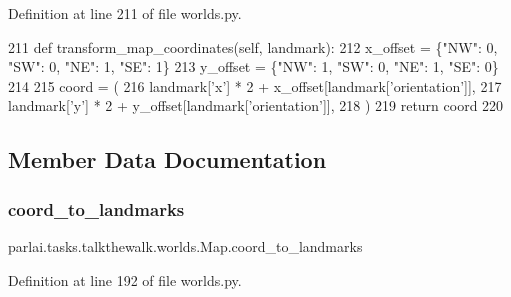 Definition at line 211 of file worlds.\+py.


\begin{DoxyCode}
211     \textcolor{keyword}{def }transform\_map\_coordinates(self, landmark):
212         x\_offset = \{\textcolor{stringliteral}{"NW"}: 0, \textcolor{stringliteral}{"SW"}: 0, \textcolor{stringliteral}{"NE"}: 1, \textcolor{stringliteral}{"SE"}: 1\}
213         y\_offset = \{\textcolor{stringliteral}{"NW"}: 1, \textcolor{stringliteral}{"SW"}: 0, \textcolor{stringliteral}{"NE"}: 1, \textcolor{stringliteral}{"SE"}: 0\}
214 
215         coord = (
216             landmark[\textcolor{stringliteral}{'x'}] * 2 + x\_offset[landmark[\textcolor{stringliteral}{'orientation'}]],
217             landmark[\textcolor{stringliteral}{'y'}] * 2 + y\_offset[landmark[\textcolor{stringliteral}{'orientation'}]],
218         )
219         \textcolor{keywordflow}{return} coord
220 
\end{DoxyCode}


\subsection{Member Data Documentation}
\mbox{\label{classparlai_1_1tasks_1_1talkthewalk_1_1worlds_1_1Map_af3a12a8efd0afe26740e2b9b7a362614}} 
\subsubsection{\texorpdfstring{coord\+\_\+to\+\_\+landmarks}{coord\_to\_landmarks}}
{\footnotesize\ttfamily parlai.\+tasks.\+talkthewalk.\+worlds.\+Map.\+coord\+\_\+to\+\_\+landmarks}



Definition at line 192 of file worlds.\+py.

\mbox{\label{classparlai_1_1tasks_1_1talkthewalk_1_1worlds_1_1Map_afdf228371d0f141ece9b3889faabe095}} 
